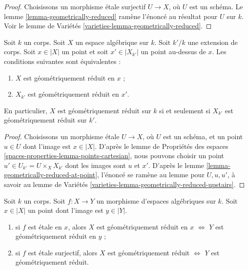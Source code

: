 \begin{proof}
Choisissons un morphisme \'etale surjectif $U \to X$, où $U$ est un schéma.
Le lemme \ref{lemma-geometrically-reduced} ramène l'énoncé au
résultat pour $U$ sur $k$.
Voir le lemme de Variétés \ref{varieties-lemma-geometrically-reduced}.
\end{proof}

\begin{lemma}
\label{lemma-geometrically-reduced-upstairs}
Soit $k$ un corps. Soit $X$ un espace algébrique sur $k$.
Soit $k'/k$ une extension de corps. Soit $x \in |X|$ un point et soit
$x' \in |X_{k'}|$ un point au-dessus de $x$.
Les conditions suivantes sont équivalentes :
\begin{enumerate}
\item $X$ est géométriquement réduit en $x$ ;
\item $X_{k'}$ est géométriquement réduit en $x'$.
\end{enumerate}
En particulier, $X$ est géométriquement réduit sur $k$ si et seulement si
$X_{k'}$ est géométriquement réduit sur $k'$.
\end{lemma}

\begin{proof}
Choisissons un morphisme \'etale $U \to X$, où $U$ est un schéma,
et un point $u \in U$ dont l'image est $x \in |X|$.
D'après le lemme de Propriétés des espaces \ref{spaces-properties-lemma-points-cartesian},
nous pouvons choisir un point $u' \in U_{k'} = U \times_X X_{k'}$ dont les images
sont $u$ et $x'$. D'après le lemme \ref{lemma-geometrically-reduced-at-point},
l'énoncé se ramène au lemme pour $U, u, u'$, à savoir au
lemme de Variétés \ref{varieties-lemma-geometrically-reduced-upstairs}.
\end{proof}

\begin{lemma}
\label{lemma-geometrically-reduced-etale-local}
Soit $k$ un corps. Soit $f : X \to Y$ un morphisme
d'espaces algébriques sur $k$. Soit $x \in |X|$ un point
dont l'image est $y \in |Y|$.
\begin{enumerate}
\item si $f$ est \'etale en $x$, alors
$X$ est géométriquement réduit en $x$ $\Leftrightarrow$
$Y$ est géométriquement réduit en $y$ ;
\item si $f$ est \'etale surjectif, alors
$X$ est géométriquement réduit $\Leftrightarrow$
$Y$ est géométriquement réduit.
\end{enumerate}
\end{lemma}

